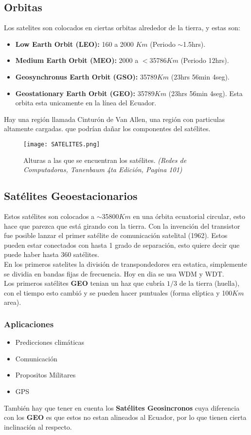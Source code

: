 \subsection*{Orbitas}
Los satelites son colocados en ciertas orbitas alrededor de la tierra, y estas son:
\begin{itemize}
\item \textbf{Low Earth Orbit (LEO):} 160 a 2000 $Km$ (Periodo $\sim$1.5hrs).
\item \textbf{Medium Earth Orbit (MEO):} 2000 a $<$35786$Km$ (Periodo 12hrs).
\item \textbf{Geosynchronus Earth Orbit (GSO):} 35789$Km$ (23hrs 56min 4seg).
\item \textbf{Geostationary Earth Orbit (GEO):} 35789$Km$ (23hrs 56min 4seg). Esta orbita esta unicamente en la línea del Ecuador.
\end{itemize}
Hay una región llamada Cinturón de Van Allen, una región con particulas altamente cargadas. que podrían dañar los componentes del satélites.

\begin{figure}[H]
\centering
\texttt{[image: SATELITES.png]}
\caption{Alturas a las que se encuentran los satélites. \textit{(Redes de Computadoras, Tanenbaum 4ta Edición, Pagina 101)}}
\end{figure}

\subsection*{Satélites Geoestacionarios}
Estos satélites son colocados a $\sim$35800$Km$ en una órbita ecuatorial circular, esto hace que parezca que está girando con la tierra. Con la invención del transistor fue posible lanzar el primer satélite de comunicación satelital (1962). Estos pueden estar conectados con hasta 1 grado de separación, esto quiere decir que puede haber hasta 360 satélites. \\${ }$\\
En los primeros satelites la división de transpondedores era estatica, simplemente se dividia en bandas fijas de frecuencia. Hoy en dia se usa WDM y WDT. \\${ }$\\
Los primeros satélites \textbf{GEO} tenian un haz que cubría $1/3$ de la tierra (huella), con el tiempo esto cambió y se pueden hacer puntuales (forma elíptica y 100$Km$ area). 
\subsubsection*{Aplicaciones}
\begin{itemize}
\item Predicciones climáticas
\item Comunicación
\item Propositos Militares
\item GPS
\end{itemize}
También hay que tener en cuenta los \textbf{Satélites Geosincronos} cuya diferencia con los \textbf{GEO} es que estos no estan alineados al Ecuador, por lo que tienen cierta inclinación al respecto.

